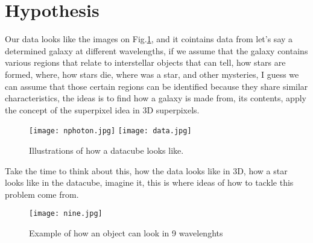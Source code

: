 \documentclass[11pt,fleqn]{book} %
\begin{document}
\section{Hypothesis}
Our data looks like the images on Fig.\ref{fig:cubes}, and it cointains data from let's say a determined galaxy at different wavelengths, if we assume that the galaxy contains various regions that relate to interstellar objects that can tell, how stars are formed, where, how stars die, where was a star, and other mysteries, I guess we can assume that those certain regions can be identified because they share similar characteristics, the ideas is to find how a galaxy is made from, its contents, apply the concept of the superpixel idea in 3D superpixels. 
\begin{figure}[h]
	\centering
    \texttt{[image: nphoton.jpg]}\hspace{1cm}
    \texttt{[image: data.jpg]}
    \caption{Illustrations of how a datacube looks like.}
    \label{fig:cubes}
\end{figure}

Take the time to think about this, how the data looks like in 3D, how a star looks like in the datacube, imagine it, this is where ideas of how to tackle this problem come from.
\begin{figure}
	\centering
    \texttt{[image: nine.jpg]}
    \caption{Example of how an object can look in 9 wavelenghts}
    \label{fig:nine}
\end{figure}
\end{document}
